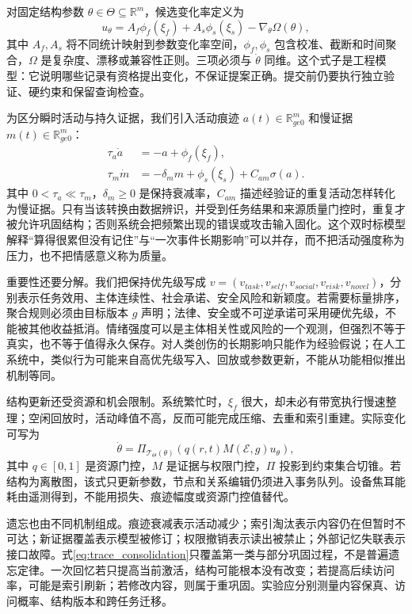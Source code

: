 对固定结构参数 $\theta\in\Theta\subseteq\mathbb R^m$，候选变化率定义为
\begin{equation}
 u_\theta=A_f\phi_f(\xi_f)+A_s\phi_s(\xi_s)-\nabla_\theta\Omega(\theta),
 \label{eq:structure_update_drive}
\end{equation}
其中 $A_f,A_s$ 将不同统计映射到参数变化率空间，$\phi_f,\phi_s$ 包含校准、截断和时间聚合，$\Omega$ 是复杂度、漂移或兼容性正则。三项必须与 $\dot\theta$ 同维。这个式子是工程模型：它说明哪些记录有资格提出变化，不保证提案正确。提交前仍要执行独立验证、硬约束和保留查询检查。

为区分瞬时活动与持久证据，我们引入活动痕迹 $a(t)\in\mathbb R_{ge0}^m$ 和慢证据 $m(t)\in\mathbb R_{ge0}^m$：
\begin{align}
 \tau_a\dot a&=-a+\phi_f(\xi_f),\\
 \tau_m\dot m&=-\delta_m m+\phi_s(\xi_s)+C_{am}\sigma(a).
 \label{eq:trace_consolidation}
\end{align}
其中 $0<\tau_a\ll\tau_m$，$\delta_m\ge0$ 是保持衰减率，$C_{am}$ 描述经验证的重复活动怎样转化为慢证据。只有当该转换由数据辨识，并受到任务结果和来源质量门控时，重复才被允许巩固结构；否则系统会把频繁出现的错误或攻击输入固化。这个双时标模型解释“算得很累但没有记住”与“一次事件长期影响”可以并存，而不把活动强度称为压力，也不把情感意义称为质量。

重要性还要分解。我们把保持优先级写成 $v=(v_{task},v_{self},v_{social},v_{risk},v_{novel})$，分别表示任务效用、主体连续性、社会承诺、安全风险和新颖度。若需要标量排序，聚合规则必须由目标版本 $g$ 声明；法律、安全或不可逆承诺可采用硬优先级，不能被其他收益抵消。情绪强度可以是主体相关性或风险的一个观测，但强烈不等于真实，也不等于值得永久保存。对人类创伤的长期影响只能作为经验假说；在人工系统中，类似行为可能来自高优先级写入、回放或参数更新，不能从功能相似推出机制等同。

结构更新还受资源和机会限制。系统繁忙时，$\xi_f$ 很大，却未必有带宽执行慢速整理；空闲回放时，活动峰值不高，反而可能完成压缩、去重和索引重建。实际变化可写为
\begin{equation}
 \dot\theta=\Pi_{\mathcal T_\Theta(\theta)}
 \left(q(r,t)M(\mathcal E,g)u_\theta\right),
\end{equation}
其中 $q\in[0,1]$ 是资源门控，$M$ 是证据与权限门控，$\Pi$ 投影到约束集合切锥。若结构为离散图，该式只更新参数，节点和关系编辑仍须进入事务队列。设备焦耳能耗由遥测得到，不能用损失、痕迹幅度或资源门控值替代。

遗忘也由不同机制组成。痕迹衰减表示活动减少；索引淘汰表示内容仍在但暂时不可达；新证据覆盖表示模型被修订；权限撤销表示读出被禁止；外部记忆失联表示接口故障。式\eqref{eq:trace_consolidation}只覆盖第一类与部分巩固过程，不是普遍遗忘定律。一次回忆若只提高当前激活，结构可能根本没有改变；若提高后续访问率，可能是索引刷新；若修改内容，则属于重巩固。实验应分别测量内容保真、访问概率、结构版本和跨任务迁移。

